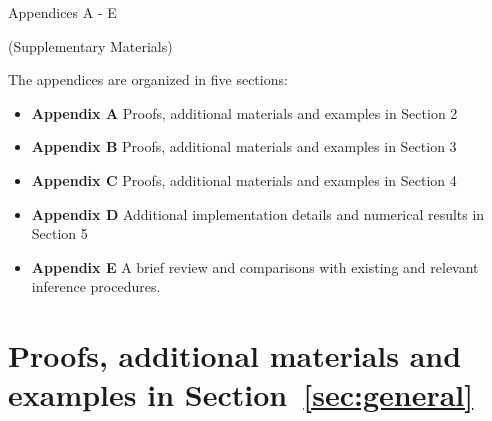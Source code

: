 \documentclass[12pt]{article}
\theoremstyle{shortspace}
\begin{document}


\appendix


\newpage




\setcounter{example}{0}
\renewcommand{\theexample}{A\arabic{example}} 


\setcounter{figure}{0}
\renewcommand{\thefigure}{A\arabic{figure}} 


\setcounter{table}{0}
\renewcommand{\thetable}{A\arabic{table}} 


\renewcommand{\theequation}{A\arabic{equation}}
\setcounter{equation}{0}

\setcounter{lemma}{0}
\renewcommand{\thelemma}{A\arabic{lemma}} 

\setcounter{theorem}{0}
\renewcommand{\thetheorem}{A\arabic{theorem}} 

\setcounter{corollary}{0}
\renewcommand{\thecorollary}{A\arabic{corollary}} 


\setcounter{page}{1}
\renewcommand{\thepage}{A\arabic{page}} %




\centerline{\LARGE {\sc Appendices A - E}}

\centerline{\large (Supplementary Materials)}

\vspace{6mm}\noindent
The appendices are organized in five sections:

\begin{itemize}
[leftmargin=1em, labelsep=0.3em, 
align=parleft,   itemsep=1pt,
  parsep=0pt,
  topsep=1pt]
    \item[] {\bf Appendix A} Proofs, additional materials and examples in Section 2
    \item[] {\bf Appendix B} Proofs, additional materials and examples in Section 3
    \item[] {\bf Appendix C} Proofs, additional materials and examples in Section 4
     \item[] {\bf Appendix D} Additional implementation details and numerical results in Section 5
 \item[] {\bf Appendix E} A brief review and comparisons with existing and relevant inference procedures.
\end{itemize}



\section{Proofs, additional materials and examples in Section~\ref{sec:general}}
\end{document}
